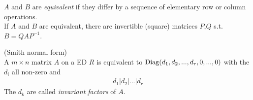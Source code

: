 \documentclass[a4paper]{article}
\begin{document}
\begin{defi}
$A$ and $B$ are \emph{equivalent} if they differ by a sequence of elementary row or column operations.\\
If $A$ and $B$ are equivalent, there are invertible (square) matrices $P$,$Q$ s.t. $B=QAP^{-1}$.
\end{defi}

\begin{thm} (Smith normal form)\\
A $m\times n$ matrix $A$ on a ED $R$ is equivalent to $\operatorname{Diag}(d_1,d_2,...,d_r,0,...,0)$ with the $d_i$ all non-zero and
\begin{equation*}
\begin{aligned}
d_1 | d_2 | ... | d_r
\end{aligned}
\end{equation*}
The $d_k$ are called \emph{invariant factors} of $A$.



\end{thm}
\end{document}
